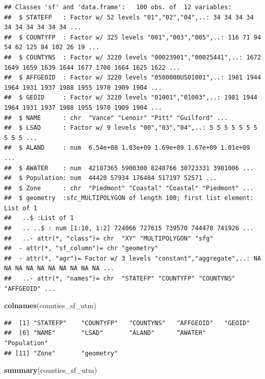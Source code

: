 \documentclass[12pt,]{article}
\newenvironment{Shaded}{\begin{snugshade}}{\end{snugshade}}
\newcommand{\KeywordTok}[1]{\textcolor[rgb]{0.13,0.29,0.53}{\textbf{#1}}}
\newcommand{\NormalTok}[1]{#1}
\begin{document}
\begin{verbatim}
## Classes 'sf' and 'data.frame':   100 obs. of  12 variables:
##  $ STATEFP   : Factor w/ 52 levels "01","02","04",..: 34 34 34 34 34 34 34 34 34 34 ...
##  $ COUNTYFP  : Factor w/ 325 levels "001","003","005",..: 116 71 94 54 62 125 84 102 26 19 ...
##  $ COUNTYNS  : Factor w/ 3220 levels "00023901","00025441",..: 1672 1649 1659 1639 1644 1677 1700 1664 1625 1622 ...
##  $ AFFGEOID  : Factor w/ 3220 levels "0500000US01001",..: 1981 1944 1964 1931 1937 1988 1955 1970 1909 1904 ...
##  $ GEOID     : Factor w/ 3220 levels "01001","01003",..: 1981 1944 1964 1931 1937 1988 1955 1970 1909 1904 ...
##  $ NAME      : chr  "Vance" "Lenoir" "Pitt" "Guilford" ...
##  $ LSAD      : Factor w/ 9 levels "00","03","04",..: 5 5 5 5 5 5 5 5 5 5 ...
##  $ ALAND     : num  6.54e+08 1.03e+09 1.69e+09 1.67e+09 1.01e+09 ...
##  $ AWATER    : num  42187365 5900300 8248766 30723331 3981006 ...
##  $ Population: num  44420 57934 176484 517197 52571 ...
##  $ Zone      : chr  "Piedmont" "Coastal" "Coastal" "Piedmont" ...
##  $ geometry  :sfc_MULTIPOLYGON of length 100; first list element: List of 1
##   ..$ :List of 1
##   .. ..$ : num [1:10, 1:2] 724066 727615 739570 744478 741926 ...
##   ..- attr(*, "class")= chr  "XY" "MULTIPOLYGON" "sfg"
##  - attr(*, "sf_column")= chr "geometry"
##  - attr(*, "agr")= Factor w/ 3 levels "constant","aggregate",..: NA NA NA NA NA NA NA NA NA NA ...
##   ..- attr(*, "names")= chr  "STATEFP" "COUNTYFP" "COUNTYNS" "AFFGEOID" ...
\end{verbatim}

\begin{Shaded}
\begin{Highlighting}[]
\KeywordTok{colnames}\NormalTok{(counties_sf_utm)}
\end{Highlighting}
\end{Shaded}

\begin{verbatim}
##  [1] "STATEFP"    "COUNTYFP"   "COUNTYNS"   "AFFGEOID"   "GEOID"     
##  [6] "NAME"       "LSAD"       "ALAND"      "AWATER"     "Population"
## [11] "Zone"       "geometry"
\end{verbatim}

\begin{Shaded}
\begin{Highlighting}[]
\KeywordTok{summary}\NormalTok{(counties_sf_utm)}
\end{Highlighting}
\end{Shaded}
\end{document}
